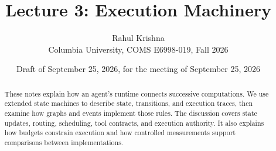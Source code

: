 \documentclass[9pt,twocolumn]{extarticle}
\title{Lecture 3: Execution Machinery}
\author{Rahul Krishna\\Columbia University, COMS E6998-019, Fall 2026}
\date{Draft of September 25, 2026, for the meeting of September 25, 2026}
\theoremstyle{definition}
\begin{document}
\maketitle
\begin{abstract}
These notes explain how an agent's runtime connects successive computations. We use extended
state machines to describe state, transitions, and execution traces, then examine how graphs and
events implement those rules. The discussion covers state updates, routing, scheduling, tool
contracts, and execution authority. It also explains how budgets constrain execution and how
controlled measurements support comparisons between implementations.
\end{abstract}
\tableofcontents














\clearpage
\appendix
\raggedbottom

\clearpage

\end{document}
